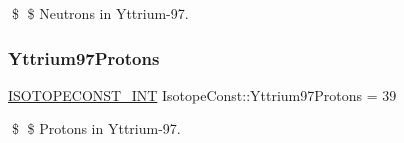 \$ \$ Neutrons in Yttrium-\/97. \mbox{\label{group___isotope_const-_yttrium-_y97_ga171f0d1a99024ed59a97bf81a796c04e}} 
\subsubsection{\texorpdfstring{Yttrium97\+Protons}{Yttrium97Protons}}
{\footnotesize\ttfamily \mbox{\hyperlink{group___isotope_const-_macros_ga5f18360b3e99483a35c32d789e62621c}{I\+S\+O\+T\+O\+P\+E\+C\+O\+N\+S\+T\+\_\+\+I\+NT}} Isotope\+Const\+::\+Yttrium97\+Protons = 39}

\$ \$ Protons in Yttrium-\/97. 